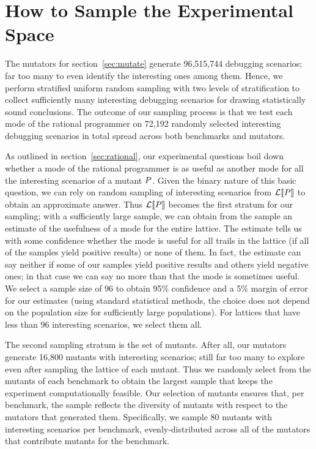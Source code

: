 \section{How to Sample the Experimental Space} 

The mutators for section~\ref{sec:mutate} generate 96,515,744 debugging scenarios; 
far too many to even identify the interesting ones among
them. Hence, we perform stratified uniform random sampling with two
levels of stratification to collect sufficiently many interesting
debugging scenarios for drawing statistically sound conclusions. 
The outcome of our sampling process is that we test each mode of the
rational programmer on 72,192 randomly selected interesting debugging
scenarios in total spread across both benchmarks and mutators.



As outlined in section~\ref{sec:rational}, our experimental questions
boil down whether a mode of the rational programmer is
as useful as another mode for all the interesting scenarios of a mutant $P$.
Given the binary nature of this basic question, we can rely on random
sampling of interesting scenarios from $\mathcal{L}\llbracket P\rrbracket$ to obtain an
approximate answer.  Thus $\mathcal{L}\llbracket P\rrbracket$ becomes the first stratum
for our sampling; with a sufficiently large sample, we can obtain from the
sample an estimate of the usefulness of a mode for the entire lattice.
The estimate tells us with some confidence whether the mode is useful for all trails in the lattice (if all of the samples yield positive results) or none of them.
In fact, the estimate can say neither if some of our samples yield positive results and others yield negative ones; in that case we can say no more than that the mode is sometimes useful.
We select a sample size of 96 to obtain 95\% confidence and a 5\% margin of error for our estimates
(using standard statistical methods, the choice does not depend on the population size for sufficiently large populations).
For lattices that have less than 96 interesting scenarios, we select them all.

The second sampling stratum is the set of mutants. After all, our mutators
generate 16,800 mutants with interesting scenarios; still far too many to
explore even after sampling the lattice of each mutant. Thus we randomly
select from the mutants of each benchmark to obtain the largest
sample that keeps the experiment computationally feasible.
Our selection of mutants ensures that, per benchmark, the sample reflects the diversity of mutants with
respect to the mutators that generated them.  Specifically,  we sample 80
mutants with interesting scenarios per benchmark,  evenly-distributed
across all of the mutators that contribute mutants for the benchmark.


